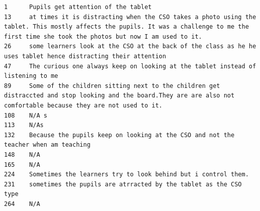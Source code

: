\documentclass[11pt]{article}
\begin{document}
    \begin{Verbatim}[commandchars=\\\{\}]
1      Pupils get attention of the tablet                                                                                                                                                          
13     at times it is distracting when the CSO takes a photo using the tablet. This mostly affects the pupils. It was a challenge to me the first time she took the photos but now I am used to it.
26     some learners look at the CSO at the back of the class as he he uses tablet hence distracting their attention                                                                               
47     The curious one always keep on looking at the tablet instead of listening to me                                                                                                             
89     Some of the children sitting next to the children get distraccted and stop looking and the board.They are are also not comfortable because they are not used to it.                         
108    N/A s                                                                                                                                                                                       
113    N/As                                                                                                                                                                                        
132    Because the pupils keep on looking at the CSO and not the teacher when am teaching                                                                                                          
148    N/A                                                                                                                                                                                         
165    N/A                                                                                                                                                                                         
224    Sometimes the learners try to look behind but i control them.                                                                                                                               
231    sometimes the pupils are atrracted by the tablet as the CSO type                                                                                                                            
264    N/A                                                                                                                                                                                         

\end{Verbatim}
\end{document}

